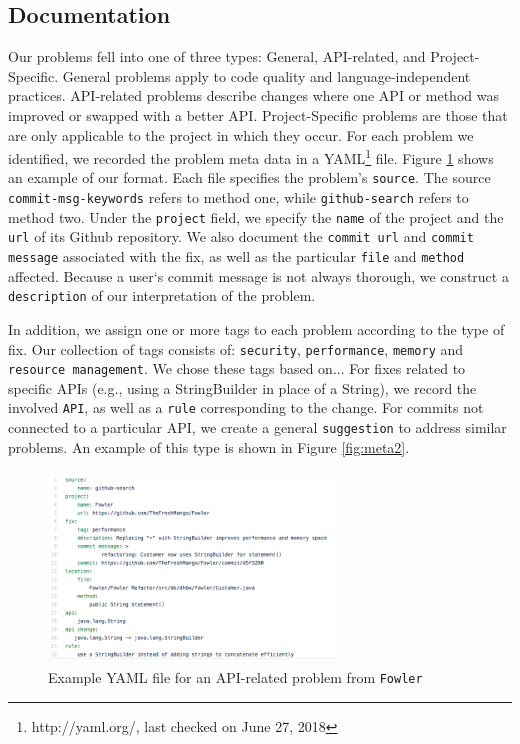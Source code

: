 \documentclass[sigconf]{acmart}
\begin{document}
\subsection{Documentation} 
Our problems fell into one of three types: General, API-related, and Project-Specific. General problems apply to code quality and language-independent practices. API-related problems describe changes where one API or method was improved or swapped with a better API. Project-Specific problems are those that are only applicable to the project in which they occur.
For each problem we identified, we recorded the problem meta data in a YAML\footnote{http://yaml.org/, last checked on June 27, 2018} file. Figure \ref{fig:meta1} shows an example of our format. Each file specifies the problem's \texttt{source}. The source \texttt{commit-msg-keywords} refers to method one, while \texttt{github-search} refers to method two. Under the \texttt{project} field, we specify the \texttt{name} of the project and the \texttt{url} of its Github repository. We also document the \texttt{commit url} and \texttt{commit message} associated with the fix, as well as the particular \texttt{file} and \texttt{method} affected. Because a user`s commit message is not always thorough, we construct a \texttt{description} of our interpretation of the problem.

In addition, we assign one or more tags to each problem according to the type of fix. Our collection of tags consists of: \texttt{security}, \texttt{performance}, \texttt{memory}  and \texttt{resource management}. We chose these tags based on... For fixes related to specific APIs (e.g., using a StringBuilder in place of  a String), we record the involved \texttt{API}, as well as a \texttt{rule} corresponding to the change. For commits not connected to a particular API, we create a general \texttt{suggestion} to address similar problems. An example of this type is shown in Figure \ref{fig:meta2}. 

\begin{figure}
  \includegraphics[height=2in, width=3in]{YAMLmetadata}
  \caption{Example YAML file for an API-related problem from \texttt{Fowler}}
  \label{fig:meta1}
\end{figure}
\end{document}
